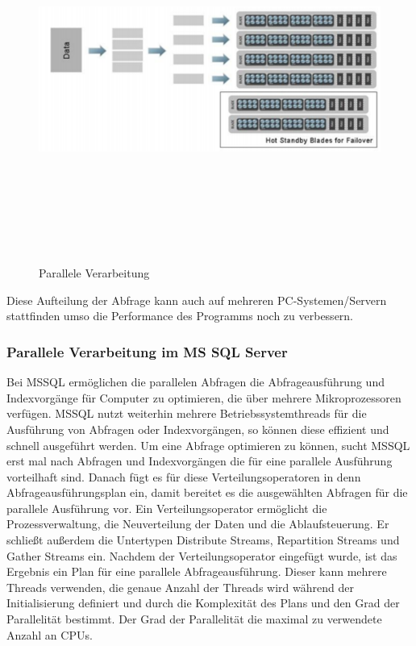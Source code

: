\documentclass[a4paper, 12pt]{scrartcl}
\begin{document}
\begin{figure}[H]
\centering
\includegraphics[height=12cm, width=17cm, keepaspectratio]{PrallelVer.png}
\caption{Parallele Verarbeitung}
\end{figure}  
Diese Aufteilung der Abfrage kann auch auf mehreren PC-Systemen/Servern stattfinden umso die Performance des Programms noch zu verbessern.
\subsubsection{Parallele Verarbeitung im MS SQL Server}
Bei MSSQL ermöglichen die parallelen Abfragen die Abfrageausführung und Indexvorgänge für Computer zu optimieren, die über mehrere Mikroprozessoren verfügen. 
MSSQL nutzt weiterhin mehrere Betriebssystemthreads für die Ausführung von Abfragen oder Indexvorgängen, so können diese effizient und schnell ausgeführt werden.
Um eine Abfrage optimieren zu können, sucht MSSQL erst mal nach Abfragen und Indexvorgängen die für eine parallele Ausführung vorteilhaft sind. Danach fügt es für diese Verteilungsoperatoren in denn Abfrageausführungsplan ein, damit bereitet es die ausgewählten Abfragen für die parallele Ausführung vor. Ein Verteilungsoperator ermöglicht die Prozessverwaltung, die Neuverteilung der Daten und die Ablaufsteuerung. Er schließt außerdem die Untertypen Distribute Streams, Repartition Streams und Gather Streams ein. 
Nachdem der Verteilungsoperator eingefügt wurde, ist das Ergebnis ein Plan für eine parallele Abfrageausführung. Dieser kann mehrere Threads verwenden, die genaue Anzahl der Threads wird während der Initialisierung definiert und durch die Komplexität des Plans und den Grad der Parallelität bestimmt. Der Grad der  Parallelität die maximal zu verwendete Anzahl an CPUs.
\end{document}
